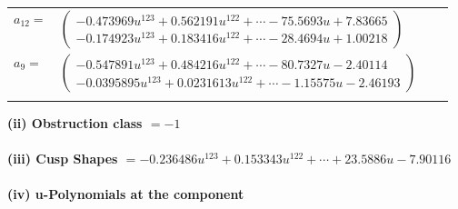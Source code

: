 \documentclass[1p]{elsarticle_modified}
\theoremstyle{definition}
\begin{document}
\begin{tabular}{m{7pt} m{180pt} m{7pt} m{180pt} }
\flushright $a_{12}=$&$\begin{pmatrix}-0.473969 u^{123}+0.562191 u^{122}+\cdots-75.5693 u+7.83665\\-0.174923 u^{123}+0.183416 u^{122}+\cdots-28.4694 u+1.00218\end{pmatrix}$ \\
\flushright $a_{9}=$&$\begin{pmatrix}-0.547891 u^{123}+0.484216 u^{122}+\cdots-80.7327 u-2.40114\\-0.0395895 u^{123}+0.0231613 u^{122}+\cdots-1.15575 u-2.46193\end{pmatrix}$\\&\end{tabular}
\flushleft \textbf{(ii) Obstruction class $= -1$}\\~\\
\flushleft \textbf{(iii) Cusp Shapes $= -0.236486 u^{123}+0.153343 u^{122}+\cdots+23.5886 u-7.90116$}\\~\\
\newpage\renewcommand{\arraystretch}{1}
\flushleft \textbf{(iv) u-Polynomials at the component}\newline \\
\end{document}
